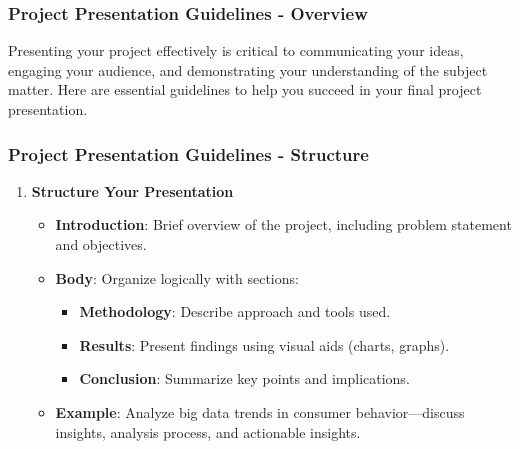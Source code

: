 \documentclass[aspectratio=169]{beamer}
\begin{document}
\begin{frame}[fragile]
    \frametitle{Project Presentation Guidelines - Overview}
    Presenting your project effectively is critical to communicating your ideas, engaging your audience, and demonstrating your understanding of the subject matter. Here are essential guidelines to help you succeed in your final project presentation.
\end{frame}

\begin{frame}[fragile]
    \frametitle{Project Presentation Guidelines - Structure}
    \begin{enumerate}
        \item \textbf{Structure Your Presentation}
        \begin{itemize}
            \item \textbf{Introduction}: Brief overview of the project, including problem statement and objectives.
            \item \textbf{Body}: Organize logically with sections:
            \begin{itemize}
                \item \textbf{Methodology}: Describe approach and tools used.
                \item \textbf{Results}: Present findings using visual aids (charts, graphs).
                \item \textbf{Conclusion}: Summarize key points and implications.
            \end{itemize}
            \item \textbf{Example}: Analyze big data trends in consumer behavior—discuss insights, analysis process, and actionable insights.
        \end{itemize}
    \end{enumerate}
\end{frame}
\end{document}
